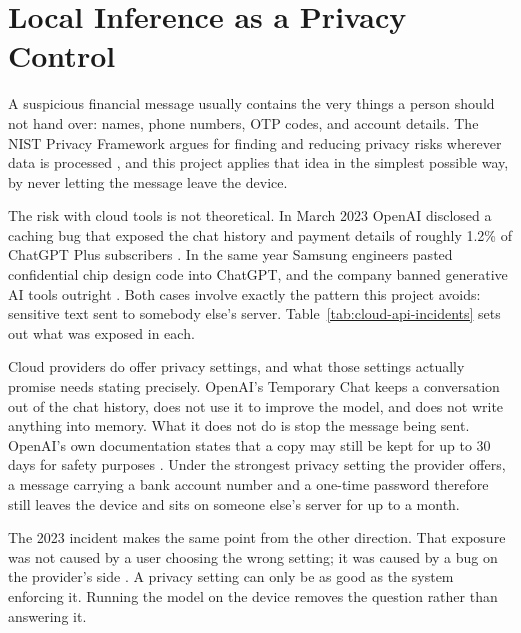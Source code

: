 \section{Local Inference as a Privacy Control}
\label{sec:local-privacy}

A suspicious financial message usually contains the very things a person should not hand over: names, phone numbers, OTP codes, and account details. The NIST Privacy Framework argues for finding and reducing privacy risks wherever data is processed \cite{nist2026privacyframework}, and this project applies that idea in the simplest possible way, by never letting the message leave the device.

The risk with cloud tools is not theoretical. In March 2023 OpenAI disclosed a caching bug that exposed the chat history and payment details of roughly 1.2\% of ChatGPT Plus subscribers \cite{openai2023breach}. In the same year Samsung engineers pasted confidential chip design code into ChatGPT, and the company banned generative AI tools outright \cite{bloomberg2023samsung}. Both cases involve exactly the pattern this project avoids: sensitive text sent to somebody else's server. Table~\ref{tab:cloud-api-incidents} sets out what was exposed in each.

Cloud providers do offer privacy settings, and what those settings actually promise needs stating precisely. OpenAI's Temporary Chat keeps a conversation out of the chat history, does not use it to improve the model, and does not write anything into memory. What it does not do is stop the message being sent. OpenAI's own documentation states that a copy may still be kept for up to 30 days for safety purposes \cite{openai2026temporarychat}. Under the strongest privacy setting the provider offers, a message carrying a bank account number and a one-time password therefore still leaves the device and sits on someone else's server for up to a month.

The 2023 incident makes the same point from the other direction. That exposure was not caused by a user choosing the wrong setting; it was caused by a bug on the provider's side \cite{openai2023breach}. A privacy setting can only be as good as the system enforcing it. Running the model on the device removes the question rather than answering it.



